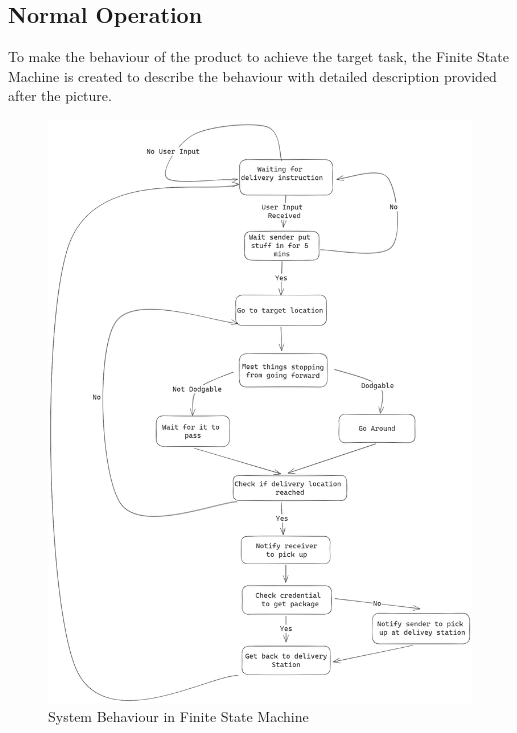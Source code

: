 \documentclass[12pt]{article}
\begin{document}
    \subsection{Normal Operation}
        To make the behaviour of the product to achieve the target task, the Finite State Machine is created to describe the behaviour with detailed description provided after the picture.
        \begin{figure}[H]
            \centering
            \includegraphics[width=\textwidth,height=\textheight,keepaspectratio]{../state-machine.png}
            \caption{System Behaviour in Finite State Machine}
        \end{figure}
    
\end{document}
